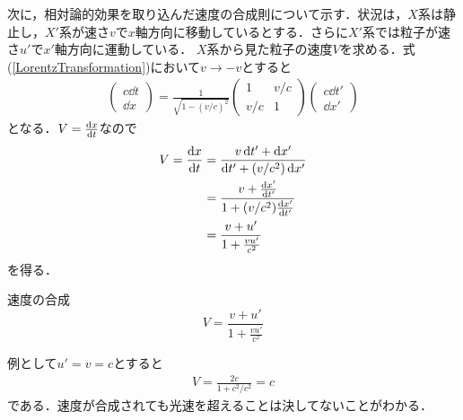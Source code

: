 \documentclass{report}
\begin{document}
  次に，相対論的効果を取り込んだ速度の合成則について示す．状況は，$X$系は静止し，$X'$系が速さ$v$で$x$軸方向に移動しているとする．さらに$X'$系では粒子が速さ$u'$で$x'$軸方向に運動している．
  $X$系から見た粒子の速度$V$を求める．式(\ref{LorentzTransformation})において$v\to -v$とすると
  \begin{align}
    \begin{pmatrix}
      c\dd{t} \\ \dd{x}
    \end{pmatrix}
    =
    \frac{1}{\sqrt{1 - (v/c)^2}}
    \begin{pmatrix}
      1 & v/c\\
      v/c & 1
    \end{pmatrix}
    \begin{pmatrix}
      c\dd{t'}\\\dd{x'}
    \end{pmatrix}
  \end{align}
  となる．$V=\dv{x}{t}$なので
  \begin{align}
    V = \dv{x}{t} &= \frac{v \dd{t'} + \dd{x'}}{\dd{t'} + (v/c^2)\dd{x'}}\\
    &= \frac{v + \dv{x'}{t'}}{1 + (v/c^2)\dv{x'}{t'}}\\
    &= \frac{v + u'}{1 + \frac{vu'}{c^2}}
  \end{align}
  を得る．
  \begin{itembox}[l]{速度の合成}
    \begin{equation}
      V = \frac{v + u'}{1 + \frac{vu'}{c^2}}
    \end{equation}
  \end{itembox}
  例として$u' = v = c$とすると
  \begin{align}
    V = \frac{2c}{1+c^2/c^2} = c
  \end{align}
  である．速度が合成されても光速を超えることは決してないことがわかる．
\end{document}
